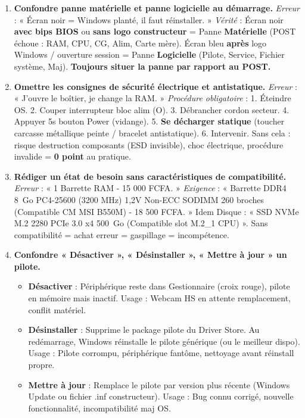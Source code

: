 \documentclass[11pt]{article}
\begin{document}
\begin{attention}
\begin{enumerate}
\item \textbf{Confondre panne matérielle et panne logicielle au démarrage.}
    \emph{Erreur} : « Écran noir = Windows planté, il faut réinstaller. »
    \emph{Vérité} : Écran noir \textbf{avec bips BIOS} ou \textbf{sans logo constructeur} = Panne \textbf{Matérielle} (POST échoue : RAM, CPU, CG, Alim, Carte mère). Écran bleu \textbf{après} logo Windows / ouverture session = Panne \textbf{Logicielle} (Pilote, Service, Fichier système, Maj). \textbf{Toujours situer la panne par rapport au POST.}
\item \textbf{Omettre les consignes de sécurité électrique et antistatique.}
    \emph{Erreur} : « J'ouvre le boîtier, je change la RAM. »
    \emph{Procédure obligatoire} : 1. Éteindre OS. 2. Couper interrupteur bloc alim (O). 3. Débrancher cordon secteur. 4. Appuyer 5s bouton Power (vidange). 5. \textbf{Se décharger statique} (toucher carcasse métallique peinte / bracelet antistatique). 6. Intervenir. Sans cela : risque destruction composants (ESD invisible), choc électrique, procédure invalide = \textbf{0 point} au pratique.
\item \textbf{Rédiger un état de besoin sans caractéristiques de compatibilité.}
    \emph{Erreur} : « 1 Barrette RAM - 15 000 FCFA. »
    \emph{Exigence} : « Barrette DDR4 \SI{8}{Go} PC4-25600 (3200 MHz) 1,2V Non-ECC SODIMM 260 broches (Compatible CM MSI B550M) - 18 500 FCFA. » Idem Disque : « SSD NVMe M.2 2280 PCIe 3.0 x4 \SI{500}{Go} (Compatible slot M.2\_1 CPU) ». Sans compatibilité = achat erreur = gaspillage = incompétence.
\item \textbf{Confondre « Désactiver », « Désinstaller », « Mettre à jour » un pilote.}
    \begin{itemize}
    \item \textbf{Désactiver} : Périphérique reste dans Gestionnaire (croix rouge), pilote en mémoire mais inactif. Usage : Webcam HS en attente remplacement, conflit matériel.
    \item \textbf{Désinstaller} : Supprime le package pilote du Driver Store. Au redémarrage, Windows réinstalle le pilote générique (ou le meilleur dispo). Usage : Pilote corrompu, périphérique fantôme, nettoyage avant réinstall propre.
    \item \textbf{Mettre à jour} : Remplace le pilote par version plus récente (Windows Update ou fichier .inf constructeur). Usage : Bug connu corrigé, nouvelle fonctionnalité, incompatibilité maj OS.

\end{itemize}
\end{enumerate}
\end{attention}
\end{document}

